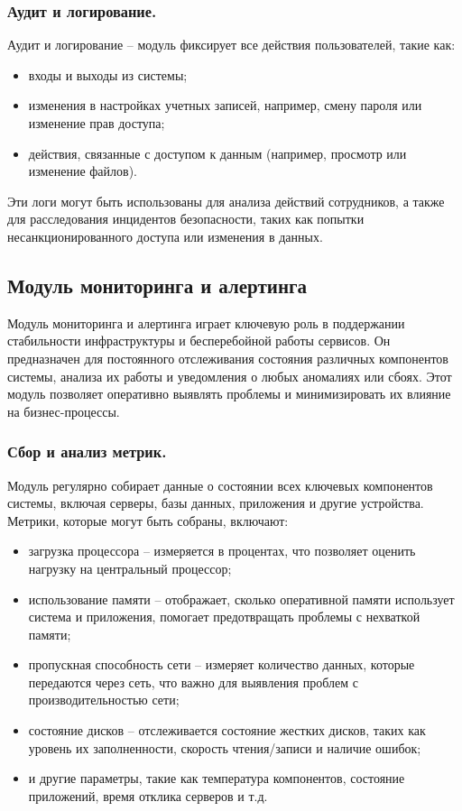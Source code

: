 \subsubsection{Аудит и логирование.} Аудит и логирование -- модуль фиксирует все действия пользователей, такие как:
\begin{itemize}
    \item входы и выходы из системы;
    \item изменения в настройках учетных записей, например, смену пароля или изменение прав доступа;
    \item действия, связанные с доступом к данным (например, просмотр или изменение файлов).
\end{itemize}
Эти логи могут быть использованы для анализа действий сотрудников, а также для расследования инцидентов безопасности, таких как попытки несанкционированного доступа или изменения в данных.

\subsection{Модуль мониторинга и алертинга}
\label{sec:monitoring_alerting_functionality}

Модуль мониторинга и алертинга играет ключевую роль в поддержании стабильности инфраструктуры и бесперебойной работы сервисов. Он предназначен для постоянного отслеживания состояния различных компонентов системы, анализа их работы и уведомления о любых аномалиях или сбоях. Этот модуль позволяет оперативно выявлять проблемы и минимизировать их влияние на бизнес-процессы.

\subsubsection{Сбор и анализ метрик.} Модуль регулярно собирает данные о состоянии всех ключевых компонентов системы, включая серверы, базы данных, приложения и другие устройства. Метрики, которые могут быть собраны, включают:
\begin{itemize}
    \item загрузка процессора -- измеряется в процентах, что позволяет оценить нагрузку на центральный процессор;
    \item использование памяти -- отображает, сколько оперативной памяти использует система и приложения, помогает предотвращать проблемы с нехваткой памяти;
    \item пропускная способность сети -- измеряет количество данных, которые передаются через сеть, что важно для выявления проблем с производительностью сети;
    \item состояние дисков -- отслеживается состояние жестких дисков, таких как уровень их заполненности, скорость чтения/записи и наличие ошибок;
    \item и другие параметры, такие как температура компонентов, состояние приложений, время отклика серверов и т.д.
\end{itemize}


